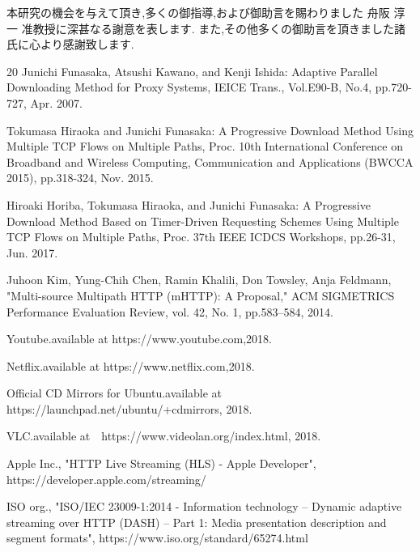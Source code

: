 \documentclass[a4j,12pt]{gradthesis_utf8}
\begin{document}
\clearpage
%
\begin{acknowledgment}
 本研究の機会を与えて頂き,多くの御指導,および御助言を賜わりました
舟阪 淳一 准教授に深甚なる謝意を表します.
また,その他多くの御助言を頂きました諸氏に心より感謝致します.
\end{acknowledgment}
\begin{flushleft}
\begin {thebibliography}{20} 
	Junichi Funasaka, Atsushi Kawano, and Kenji Ishida: Adaptive Parallel Downloading Method for Proxy Systems, IEICE Trans., Vol.E90-B, No.4, pp.720-727, Apr. 2007.
	
	Tokumasa Hiraoka and Junichi Funasaka: A Progressive Download Method Using Multiple TCP Flows on Multiple Paths, Proc. 10th International Conference on Broadband and Wireless Computing, Communication and Applications (BWCCA 2015), pp.318-324, Nov. 2015. 
	
	Hiroaki Horiba, Tokumasa Hiraoka, and Junichi Funasaka: A Progressive Download Method Based on Timer-Driven Requesting Schemes Using Multiple TCP Flows on Multiple Paths, Proc. 37th IEEE ICDCS Workshops, pp.26-31, Jun. 2017.
	
	Juhoon Kim, Yung-Chih Chen, Ramin Khalili, Don Towsley, Anja Feldmann,
	"Multi-source Multipath HTTP (mHTTP): A Proposal,"
	ACM SIGMETRICS Performance Evaluation Review, vol. 42, No. 1, pp.583--584, 2014.
	
	Youtube.available at https://www.youtube.com,2018.
	
	Netflix.available at https://www.netflix.com,2018.
	
	Official CD Mirrors for Ubuntu.available at https://launchpad.net/ubuntu/+cdmirrors, 2018.
	
	VLC.available at　https://www.videolan.org/index.html, 2018.
	
	Apple Inc., "HTTP Live Streaming (HLS) - Apple Developer", https://developer.apple.com/streaming/
	
	ISO org., "ISO/IEC 23009-1:2014 - Information technology -- Dynamic adaptive streaming over HTTP (DASH) -- Part 1: Media presentation description and segment formats", https://www.iso.org/standard/65274.html
\end {thebibliography}
\end{flushleft}
\end{document}
